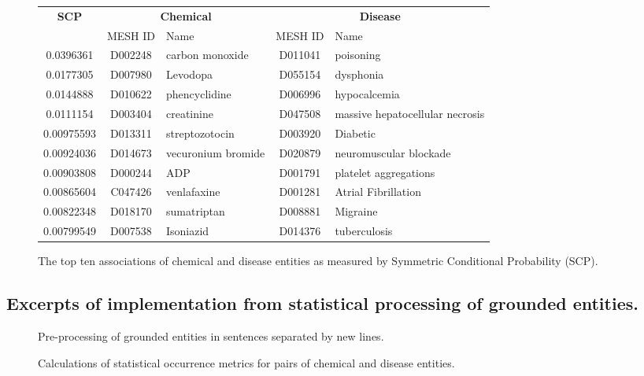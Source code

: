 \documentclass[10pt, oneside]{article}
\begin{document}
\begin{figure}[h]
\begin{center}
\fontsize{9}{11}\selectfont
\begin{tabular}{|*{2}{c|}p{4.5cm}|c|p{4.5cm}|}\hline
 \multirow{2}{*}{\textbf{SCP}} & \multicolumn{2}{c|}{\textbf{Chemical}} & \multicolumn{2}{c|}{\textbf{Disease}} \\ \cline{2-5}
 & MESH ID   & Name                      & MESH ID   & Name                         \\ \hline
 0.0396361  & D002248   & carbon monoxide    & D011041   & poisoning                       \\ \hline
 0.0177305  & D007980   & Levodopa           & D055154   & dysphonia                       \\ \hline
 0.0144888  & D010622   & phencyclidine      & D006996   & hypocalcemia                    \\ \hline
 0.0111154  & D003404   & creatinine         & D047508   & massive hepatocellular necrosis \\ \hline
 0.00975593 & D013311   & streptozotocin     & D003920   & Diabetic                        \\ \hline
 0.00924036 & D014673   & vecuronium bromide & D020879   & neuromuscular blockade          \\ \hline
 0.00903808 & D000244   & ADP                & D001791   & platelet aggregations           \\ \hline
 0.00865604 & C047426   & venlafaxine        & D001281   & Atrial Fibrillation             \\ \hline
 0.00822348 & D018170   & sumatriptan        & D008881   & Migraine                        \\ \hline
 0.00799549 & D007538   & Isoniazid          & D014376   & tuberculosis                    \\ \hline
\end{tabular}
\caption{\label{fig:scp} The top ten associations of chemical and disease entities as measured by Symmetric Conditional Probability (SCP).}
\end{center}
\end{figure}


\small{}
\begin{appendices}
\section{Excerpts of implementation from statistical processing of grounded entities.} \label{sec:implementations}
\begin{figure}[h]
\caption{\label{fig:preprocessing} Pre-processing of grounded entities in sentences separated by new lines.}
\end{figure}

\begin{figure}[h]
\caption{\label{fig:stats-calc} Calculations of statistical occurrence metrics for pairs of chemical and disease entities.}
\end{figure}

\end{appendices}
\end{document}
